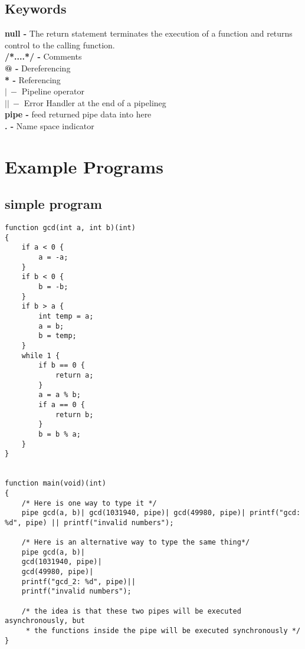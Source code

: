 \documentclass[11pt]{article}
\begin{document}
\subsection{ Keywords}
\begin{adjustwidth}{1cm}{}
\textbf {null -} The return statement terminates the execution of a function and returns control to the calling function.\\
\textbf{/*....*/ - } Comments \\ 
\textbf{@ - } Dereferencing \\ 
\textbf{* -} Referencing\\ 
$\mathbf{\vert \ -}$ Pipeline operator\\ 
$\mathbf{\vert \vert \ -}$  Error Handler at the end of a pipelineg\\
\textbf{pipe -} feed returned pipe data into here\\ 
\textbf{. -} Name space indicator\\
\end{adjustwidth}


\section{Example Programs}
\subsection{simple program}
\begin{lstlisting}
function gcd(int a, int b)(int)
{
	if a < 0 {
		a = -a;
	}
	if b < 0 {
		b = -b;
	}
	if b > a {
		int temp = a;
		a = b;
		b = temp;
	}
	while 1 {
		if b == 0 {
			return a;
		}
		a = a % b;
		if a == 0 {
			return b;		
		}
		b = b % a;
	}
}


function main(void)(int)
{
	/* Here is one way to type it */
	pipe gcd(a, b)| gcd(1031940, pipe)| gcd(49980, pipe)| printf("gcd: %d", pipe) || printf("invalid numbers");
	
	/* Here is an alternative way to type the same thing*/
	pipe gcd(a, b)|
	gcd(1031940, pipe)|
	gcd(49980, pipe)|
	printf("gcd_2: %d", pipe)||
	printf("invalid numbers");
	
	/* the idea is that these two pipes will be executed asynchronously, but
	 * the functions inside the pipe will be executed synchronously */
}

\end{lstlisting}
\end{document}
